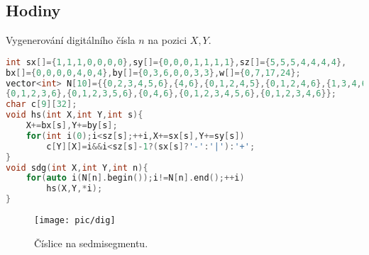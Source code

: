 \documentclass[11pt]{article}
\begin{document}
\subsection{Hodiny}
Vygenerování digitálního čísla $n$ na pozici $X,Y$.
\begin{lstlisting}[language=C++]
int sx[]={1,1,1,0,0,0,0},sy[]={0,0,0,1,1,1,1},sz[]={5,5,5,4,4,4,4},
bx[]={0,0,0,0,4,0,4},by[]={0,3,6,0,0,3,3},w[]={0,7,17,24};
vector<int> N[10]={{0,2,3,4,5,6},{4,6},{0,1,2,4,5},{0,1,2,4,6},{1,3,4,6},
{0,1,2,3,6},{0,1,2,3,5,6},{0,4,6},{0,1,2,3,4,5,6},{0,1,2,3,4,6}};
char c[9][32];
void hs(int X,int Y,int s){
    X+=bx[s],Y+=by[s];
    for(int i(0);i<sz[s];++i,X+=sx[s],Y+=sy[s])
        c[Y][X]=i&&i<sz[s]-1?(sx[s]?'-':'|'):'+';
}
void sdg(int X,int Y,int n){
    for(auto i(N[n].begin());i!=N[n].end();++i)
        hs(X,Y,*i);
}
\end{lstlisting}
\begin{figure}[H]
  \centering
  \texttt{[image: pic/dig]}
  \caption[Číslice na sedmisegmentu.]{Číslice na sedmisegmentu.}
\end{figure}
\end{document}
